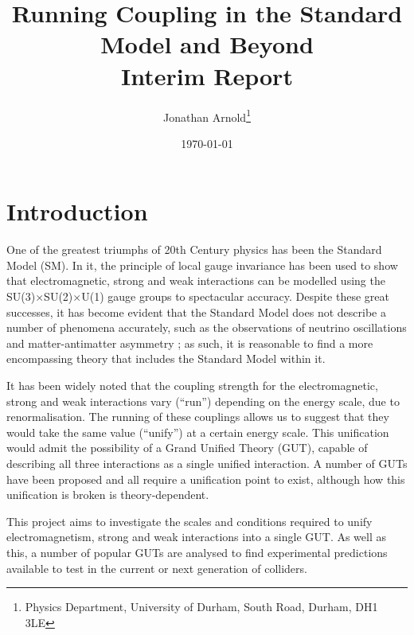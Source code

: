 \documentclass[12pt,a4paper,oneside]{article}
\begin{document}
\title{Running Coupling in the Standard Model and Beyond\\Interim Report} 
\date{\today}
\author{Jonathan Arnold\thanks{Physics Department, University of Durham, South Road, Durham, DH1 3LE}}

\maketitle


\doublespace

\section{Introduction}
One of the greatest triumphs of 20th Century physics has been the Standard Model (SM). In it, the principle of local gauge invariance has been used to show that electromagnetic, strong and weak interactions can be modelled using the SU(3)$\times$SU(2)$\times$U(1) gauge groups to spectacular accuracy\cite{sm-1,sm-2}. Despite these great successes, it has become evident that the Standard Model does not describe a number of phenomena accurately, such as the observations of neutrino oscillations \cite{neutrinos} and matter-antimatter asymmetry \cite{mass}; as such, it is reasonable to find a more encompassing theory that includes the Standard Model within it.

It has been widely noted \cite{amaldi, running-2} that the coupling strength for the electromagnetic, strong and weak interactions vary (``run'') depending on the energy scale, due to renormalisation. The running of these couplings allows us to suggest that they would take the same value (``unify'') at a certain energy scale. This unification would admit the possibility of a Grand Unified Theory (GUT), capable of describing all three interactions as a single unified interaction. A number of GUTs have been proposed \cite{pdg} and all require a unification point to exist, although how this unification is broken is theory-dependent.

This project aims to investigate the scales and conditions required to unify electromagnetism, strong and weak interactions into a single GUT. As well as this, a number of popular GUTs are analysed to find experimental predictions available to test in the current or next generation of colliders.
\end{document}
